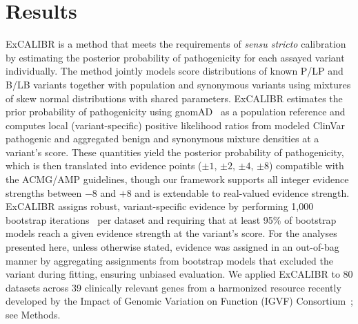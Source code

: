 \documentclass[11pt]{article}
\theoremstyle{plain}
\newcommand{\NumDatasets}{80 }
\newcommand{\NumGenesCalibrated}{39 }
\newcommand{\NumBootstraps}{1,000 }
\newcommand{\excalibr}{ExCALIBR\xspace}
\begin{document}
\section*{Results}

\excalibr is a method that meets the requirements of \emph{sensu stricto} calibration by estimating the posterior probability of pathogenicity for each assayed variant individually. %
The method jointly models score distributions of known P/LP and B/LB variants together with population and synonymous variants using mixtures of skew normal distributions with shared parameters. \excalibr estimates the prior probability of pathogenicity using gnomAD~\cite{chen2024_gnomad} as a population reference and computes local (variant-specific) positive likelihood ratios from modeled ClinVar~\cite{landrum2018clinvar} pathogenic and aggregated benign and synonymous mixture densities at a variant's score. 
These quantities yield the posterior probability of pathogenicity, which is then translated into evidence points ($\pm1$, $\pm2$, $\pm4$, $\pm8$) compatible with the ACMG/AMP guidelines, though our framework supports %
all %
integer evidence strengths %
between $-8$ and $+8$ and is extendable to real-valued evidence strength. \excalibr assigns robust, variant-specific evidence by performing \NumBootstraps bootstrap iterations~\cite{Efron1986} per dataset and requiring that at least 95\% of bootstrap models reach a given evidence strength at the variant's score. For the analyses presented here, unless otherwise stated, evidence was assigned in an out-of-bag manner by aggregating assignments from bootstrap models that excluded the variant during fitting, ensuring unbiased evaluation. We applied \excalibr to \NumDatasets datasets across \NumGenesCalibrated clinically relevant genes from a harmonized resource recently developed by the Impact of Genomic Variation on Function (IGVF) Consortium~\cite{igvf_pp}; see Methods.

\end{document}
